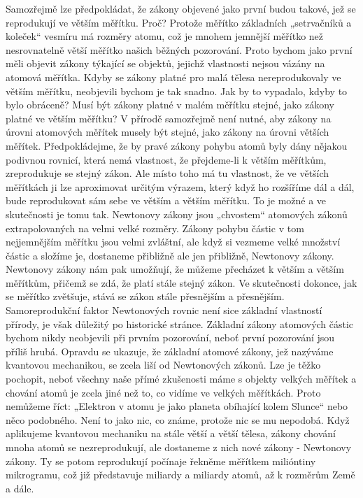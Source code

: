     Samozřejmě lze předpokládat, že zákony objevené jako první budou takové, jež se reprodukují ve
    větším měřítku. Proč? Protože měřítko základních „setrvačníků a koleček“ vesmíru má rozměry
    atomu, což je mnohem jemnější měřítko než nesrovnatelně větší měřítko našich běžných pozorování.
    Proto bychom jako první měli objevit zákony týkající se objektů, jejichž vlastnosti nejsou
    vázány na atomová měřítka. Kdyby se zákony platné pro malá tělesa nereprodukovaly ve větším
    měřítku, neobjevili bychom je tak snadno. Jak by to vypadalo, kdyby to bylo obráceně? Musí být
    zákony platné v malém měřítku stejné, jako zákony platné ve větším měřítku? V přírodě samozřejmě
    není nutné, aby zákony na úrovni atomových měřítek musely být stejné, jako zákony na úrovni
    větších měřítek. Předpokládejme, že by pravé zákony pohybu atomů byly dány nějakou podivnou
    rovnicí, která nemá vlastnost, že přejdeme-li k větším měřítkům, zreprodukuje se stejný zákon.
    Ale místo toho má tu vlastnost, že ve větších měřítkách ji lze aproximovat určitým výrazem,
    který když ho rozšíříme dál a dál, bude reprodukovat sám sebe ve větším a větším měřítku. To je
    možné a ve skutečnosti je tomu tak. Newtonovy zákony jsou „chvostem“ atomových zákonů
    extrapolovaných na velmi velké rozměry. Zákony pohybu částic v tom nejjemnějším měřítku jsou
    velmi zvláštní, ale když si vezmeme velké množství částic a složíme je, dostaneme přibližně ale
    jen přibližně, Newtonovy zákony. Newtonovy zákony nám pak umožňují, že můžeme přecházet k větším
    a větším měřítkům, přičemž se zdá, že platí stále stejný zákon. Ve skutečnosti dokonce, jak se
    měřítko zvětšuje, stává se zákon stále přesnějším a přesnějším. Samoreprodukční faktor
    Newtonových rovnic není sice základní vlastností přírody, je však důležitý po historické
    stránce. Základní zákony atomových částic bychom nikdy neobjevili při prvním pozorování, neboť
    první pozorování jsou příliš hrubá. Opravdu se ukazuje, že základní atomové zákony, jež nazýváme
    kvantovou mechanikou, se zcela liší od Newtonových zákonů. Lze je těžko pochopit, neboť všechny
    naše přímé zkušenosti máme s objekty velkých měřítek a chování atomů je zcela jiné než to, co
    vidíme ve velkých měřítkách. Proto nemůžeme říct: „Elektron v atomu je jako planeta obíhající
    kolem Slunce“ nebo něco podobného. Není to jako nic, co známe, protože nic se mu nepodobá. Když
    aplikujeme kvantovou mechaniku na stále větší a větší tělesa, zákony chování mnoha atomů se
    nezreprodukují, ale dostaneme z nich nové zákony - Newtonovy zákony. Ty se potom reprodukují
    počínaje řekněme měřítkem milióntiny mikrogramu, což již představuje miliardy a miliardy atomů,
    až k rozměrům Země a dále. 
    
